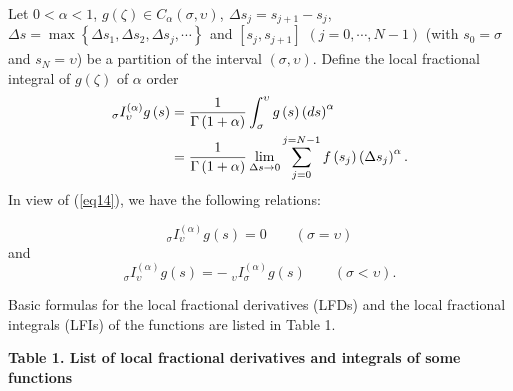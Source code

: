\documentclass[10pt]{NSP1}
\begin{document}
Let $0<\alpha <1$, $g\left( \zeta \right)\in C_\alpha \left( {\sigma
,\upsilon } \right)$, $_{ }\Delta s_j =s_{j+1} -s_j $,
$\Delta s=\max
\left\{ {\Delta s_1 ,\Delta s_2 ,\Delta s_j ,\cdots} \right\}_{ }$
and $\left[{s_j ,s_{j+1} } \right]$ $(j=0,\cdots,N-1)$ (with $s_0 =\sigma$
and $s_N =\upsilon$) be a
partition of the interval $\left( {\sigma ,\upsilon } \right)$. Define the
local fractional integral of $g\left( \zeta \right)$ of $\alpha $ order
\cite{22,23,35,36,37,38,39,40,41}
\begin{align}
\label{eq14}
{ }_\sigma I_\upsilon ^{\left( \alpha \right)}g\left( s
\right)&=\frac{1}{\Gamma \left( {1+\alpha } \right)}\int_\sigma ^\upsilon
{g\left( s \right)\left( {ds} \right)^\alpha }\notag\\
& =\frac{1}{\Gamma \left(
{1+\alpha } \right)}\mathop {\lim }\limits_{\Delta s\to 0}
\sum\limits_{j=0}^{j=N-1} {f\left( {s_j } \right)} \left( {\Delta s_j }
\right)^\alpha .
\end{align}
In view of (\ref{eq14}), we have the following relations:

\begin{equation}
{ }_\sigma I_\upsilon ^{\left( \alpha \right)}g\left( s \right)=0 \qquad (\sigma
=\upsilon)
\end{equation}
and
\begin{equation}
{ }_\sigma I_\upsilon ^{\left( \alpha \right)}g\left( s
\right)=-\;{ }_\upsilon I_\sigma ^{\left( \alpha \right)}g\left( s \right)\qquad
(\sigma <\upsilon).
\end{equation}

Basic formulas for the local fractional derivatives (LFDs) and the local
fractional integrals (LFIs) of the functions are listed in Table 1.\\

\begin{center}
\textbf{Table 1. List of local fractional derivatives and integrals of some
functions}
\end{center}
\end{document}
